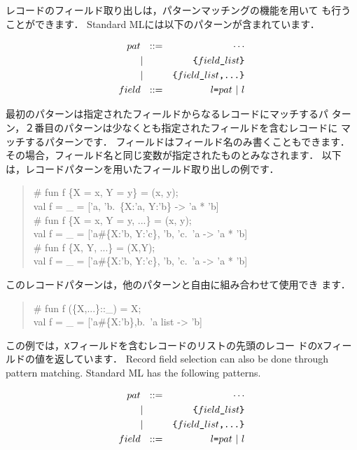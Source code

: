 \documentclass{jbook}
\newif\ifjp
\begin{document}
\ifjp%
	レコードのフィールド取り出しは，パターンマッチングの機能を用いて
も行うことができます．
	Standard MLには以下のパターンが含まれています．
\begin{tt}
\begin{eqnarray*}
pat &\mbox{\ \ }::=& \cdots \\
     &|& \mbox{\tt \{$field\_list$\}}
\\
     &|& \mbox{\tt \{$field\_list$,...\}}
\\
field &\mbox{\ \ }::=& \mbox{\tt $l$=$pat$} \ | \ l
\end{eqnarray*}
\end{tt}
	最初のパターンは指定されたフィールドからなるレコードにマッチするパ
ターン，２番目のパターンは少なくとも指定されたフィールドを含むレコードに
マッチするパターンです．
	フィールドはフィールド名のみ書くこともできます．
	その場合，フィールド名と同じ変数が指定されたものとみなされます．
	以下は，レコードパターンを用いたフィールド取り出しの例です．
\begin{tt}\begin{quote}
\# fun f \{X = x, Y = y\} = (x, y);\\
val f = \_ = ['a, 'b.~\{X:'a, Y:'b\} -> 'a * 'b]\\
\# fun f \{X = x, Y = y, ...\} = (x, y);\\
val f = \_ = ['a\#\{X:'b, Y:'c\}, 'b, 'c.~'a -> 'a * 'b]\\
\# fun f \{X, Y, ...\} = (X,Y);\\
val f = \_ = ['a\#\{X:'b, Y:'c\}, 'b, 'c.~'a -> 'a * 'b]
\end{quote}\end{tt}
	このレコードパターンは，他のパターンと自由に組み合わせて使用でき
ます．
\begin{tt}\begin{quote}
\# fun f (\{X,...\}::\_) = X;\\
val f = \_ = ['a\#\{X:'b\},b.~'a list -> 'b]\\
\end{quote}\end{tt}
	この例では，{\tt X}フィールドを含むレコードのリストの先頭のレコー
ドの{\tt X}フィールドの値を返しています．
\else%
	Record field selection can also be done through pattern
matching.
	Standard ML has the following patterns.
\begin{tt}
\begin{eqnarray*}
pat &\mbox{\ \ }::=& \cdots \\
     &|& \mbox{\tt \{$field\_list$\}}
\\
     &|& \mbox{\tt \{$field\_list$,...\}}
\\
field &\mbox{\ \ }::=& \mbox{\tt $l$=$pat$} \ | \ l
\end{eqnarray*}
\end{tt}
\end{document}
